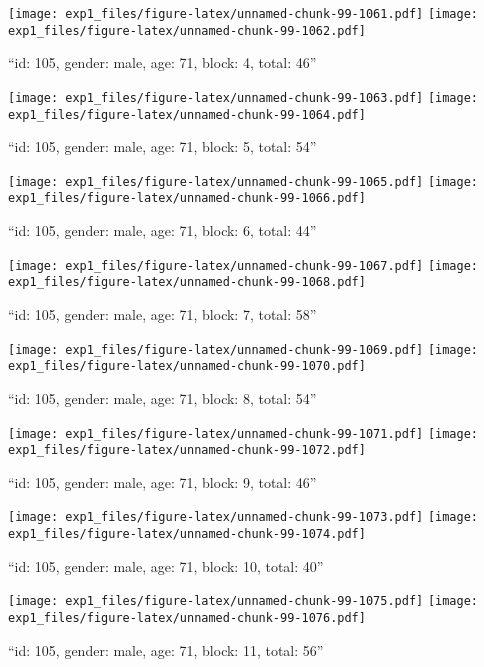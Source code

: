 \documentclass[,]{article}
\begin{document}
\texttt{[image: exp1\_files/figure-latex/unnamed-chunk-99-1061.pdf]}
\texttt{[image: exp1\_files/figure-latex/unnamed-chunk-99-1062.pdf]}

\newpage
[1] 

``id: 105, gender: male, age: 71, block: 4, total: 46''

\texttt{[image: exp1\_files/figure-latex/unnamed-chunk-99-1063.pdf]}
\texttt{[image: exp1\_files/figure-latex/unnamed-chunk-99-1064.pdf]}

\newpage
[1] 

``id: 105, gender: male, age: 71, block: 5, total: 54''

\texttt{[image: exp1\_files/figure-latex/unnamed-chunk-99-1065.pdf]}
\texttt{[image: exp1\_files/figure-latex/unnamed-chunk-99-1066.pdf]}

\newpage
[1] 

``id: 105, gender: male, age: 71, block: 6, total: 44''

\texttt{[image: exp1\_files/figure-latex/unnamed-chunk-99-1067.pdf]}
\texttt{[image: exp1\_files/figure-latex/unnamed-chunk-99-1068.pdf]}

\newpage
[1] 

``id: 105, gender: male, age: 71, block: 7, total: 58''

\texttt{[image: exp1\_files/figure-latex/unnamed-chunk-99-1069.pdf]}
\texttt{[image: exp1\_files/figure-latex/unnamed-chunk-99-1070.pdf]}

\newpage
[1] 

``id: 105, gender: male, age: 71, block: 8, total: 54''

\texttt{[image: exp1\_files/figure-latex/unnamed-chunk-99-1071.pdf]}
\texttt{[image: exp1\_files/figure-latex/unnamed-chunk-99-1072.pdf]}

\newpage
[1] 

``id: 105, gender: male, age: 71, block: 9, total: 46''

\texttt{[image: exp1\_files/figure-latex/unnamed-chunk-99-1073.pdf]}
\texttt{[image: exp1\_files/figure-latex/unnamed-chunk-99-1074.pdf]}

\newpage
[1] 

``id: 105, gender: male, age: 71, block: 10, total: 40''

\texttt{[image: exp1\_files/figure-latex/unnamed-chunk-99-1075.pdf]}
\texttt{[image: exp1\_files/figure-latex/unnamed-chunk-99-1076.pdf]}

\newpage
[1] 

``id: 105, gender: male, age: 71, block: 11, total: 56''
\end{document}
